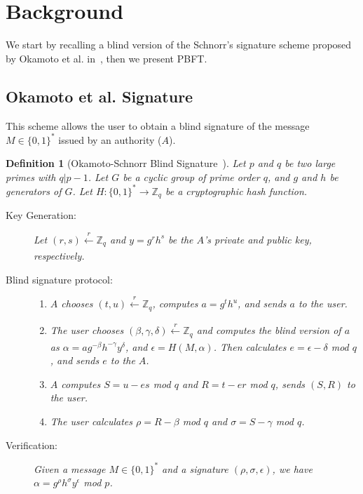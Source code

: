 \documentclass[conference]{IEEEtran}
\newtheorem{definition}{Definition}
\begin{document}
\section{Background} \label{back}

We start by recalling a blind version of the Schnorr's signature scheme proposed by Okamoto et al. in~\cite{okamoto1992provably}, then we present PBFT.

\subsection{Okamoto et al. Signature}
\label{Okamoto}

This scheme allows the user to obtain a blind signature of the message $M\in \{0,1\}^*$ issued by an authority ($A$). 

\begin{definition}[Okamoto-Schnorr Blind Signature~\cite{okamoto1992provably}]
Let $p$ and $q$ be two large primes with $q|p-1$. Let $G$ be a cyclic group of prime order $q$, and $g$ and $h$ be generators of $G$. Let $H:\{0,1\}^*\rightarrow \mathbb{Z}_q$ be a cryptographic hash function.
\begin{description}
\item[Key Generation:] Let $(r,s) \xleftarrow[]{r}\mathbb{Z}_q$ and $y=g^rh^s$ be the $A$'s private and public key, respectively.
\item[Blind signature protocol:]
\begin{enumerate}
    \item $A$ chooses $(t,u) \xleftarrow[]{r}\mathbb{Z}_q$, computes $a = g^th^u$, and sends $a$ to the user.
    \item The user chooses $(\beta, \gamma, \delta) \xleftarrow[]{r}\mathbb{Z}_q$ and computes the blind version of $a$ as $\alpha=ag^{-\beta} h^{-\gamma} y^\delta$, and $\epsilon=H(M,\alpha)$. Then calculates $e=\epsilon-\delta$ mod $q$, and sends $e$ to the $A$.
    \item $A$ computes $S=u-es$ mod $q$ and $R=t-er$ mod $q$, sends $(S,R)$ to the user.
    \item The user calculates $\rho=R-\beta$ mod $q$ and $\sigma=S-\gamma$ mod $q$.
\end{enumerate}
\item[Verification:] Given a message $M\in \{0,1\}^*$ and a signature $(\rho,\sigma,\epsilon)$, we have $\alpha=g^\rho h^\sigma y^\epsilon$ mod $p$.
\end{description}
\end{definition}
\end{document}
